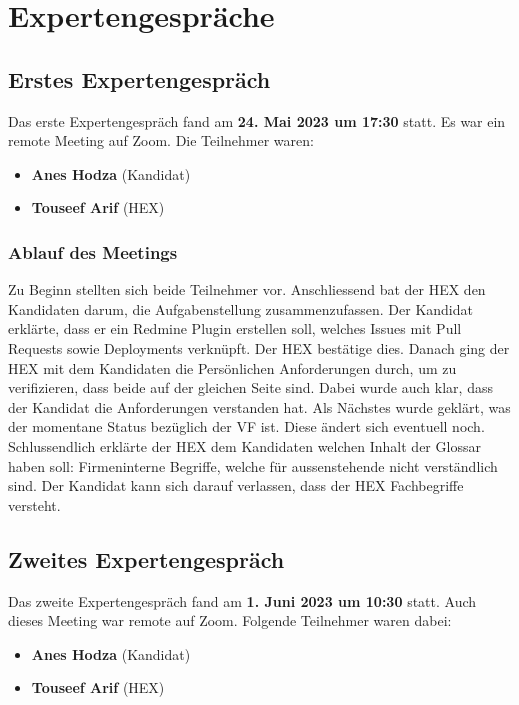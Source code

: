 \chapter{Expertengespräche}
\section{Erstes Expertengespräch}
\label{sec:first-expert-meeting}
Das erste Expertengespräch fand am \textbf{24. Mai 2023 um 17:30} statt. Es war ein remote Meeting auf Zoom.
Die Teilnehmer waren:
\begin{itemize}
  \item \textbf{Anes Hodza} (Kandidat)
  \item \textbf{Touseef Arif} (HEX)
\end{itemize}

\subsection{Ablauf des Meetings}
Zu Beginn stellten sich beide Teilnehmer vor. Anschliessend bat der HEX den Kandidaten darum, die Aufgabenstellung
zusammenzufassen. Der Kandidat erklärte, dass er ein Redmine Plugin erstellen soll, welches \gls{Issue}s mit Pull Requests
sowie Deployments verknüpft. Der HEX bestätige dies. \newline
Danach ging der HEX mit dem Kandidaten die Persönlichen Anforderungen durch, um zu verifizieren, dass beide auf der
gleichen Seite sind. Dabei wurde auch klar, dass der Kandidat die Anforderungen verstanden hat. \newline
Als Nächstes wurde geklärt, was der momentane Status bezüglich der VF ist. Diese ändert sich eventuell noch. \newline
Schlussendlich erklärte der HEX dem Kandidaten welchen Inhalt der Glossar haben soll: Firmeninterne Begriffe, welche
für aussenstehende nicht verständlich sind. Der Kandidat kann sich darauf verlassen, dass der HEX Fachbegriffe
versteht.

\section{Zweites Expertengespräch}
\label{sec:second-expert-meeting}
Das zweite Expertengespräch fand am \textbf{1. Juni 2023 um 10:30} statt. Auch dieses Meeting war remote auf Zoom.
Folgende Teilnehmer waren dabei:
\begin{itemize}
  \item \textbf{Anes Hodza} (Kandidat)
  \item \textbf{Touseef Arif} (HEX)
\end{itemize}

